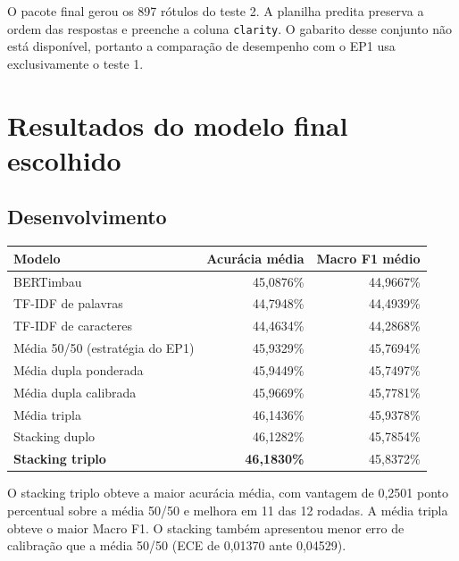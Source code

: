 \documentclass[11pt,a4paper]{article}
\begin{document}
O pacote final gerou os 897 rótulos do teste 2. A planilha predita preserva a ordem das respostas e preenche a coluna \nolinkurl{clarity}. O gabarito desse conjunto não está disponível, portanto a comparação de desempenho com o EP1 usa exclusivamente o teste 1.

\clearpage
\section{Resultados do modelo final escolhido}

\subsection{Desenvolvimento}

\begingroup\small
\begin{longtable}{@{}lrr@{}}
\toprule
\textbf{Modelo} & \textbf{Acurácia média} & \textbf{Macro F1 médio}\\
\midrule
BERTimbau & 45,0876\% & 44,9667\%\\
TF-IDF de palavras & 44,7948\% & 44,4939\%\\
TF-IDF de caracteres & 44,4634\% & 44,2868\%\\
Média 50/50 (estratégia do EP1) & 45,9329\% & 45,7694\%\\
Média dupla ponderada & 45,9449\% & 45,7497\%\\
Média dupla calibrada & 45,9669\% & 45,7781\%\\
Média tripla & 46,1436\% & 45,9378\%\\
Stacking duplo & 46,1282\% & 45,7854\%\\
\textbf{Stacking triplo} & \textbf{46,1830\%} & 45,8372\%\\
\bottomrule
\end{longtable}
\endgroup

O stacking triplo obteve a maior acurácia média, com vantagem de 0,2501 ponto percentual sobre a média 50/50 e melhora em 11 das 12 rodadas. A média tripla obteve o maior Macro F1. O stacking também apresentou menor erro de calibração que a média 50/50 (ECE de 0,01370 ante 0,04529).
\end{document}
